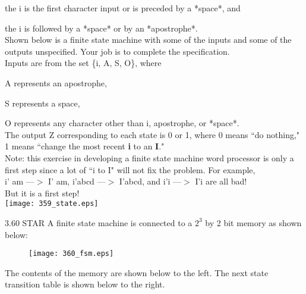 \documentclass{patt}
\begin{document}
\begin{exercises}
the i is the first character input or is preceded by a *space*, and

the i is followed by a *space* or by an *apostrophe*.
\\

\vspace{0.2in}
\noindent
Shown below is a finite state machine with some of the inputs and some of the
outputs unspecified.  Your job is to complete the specification.
\\
\vspace{0.2in}
\noindent
Inputs are from the set \{i, A, S, O\}, where 
\par A represents an apostrophe,
\par S represents a space,
\par O represents any character other than i, apostrophe, or *space*.
\\

\noindent
The output Z corresponding to each state is 0 or 1, where 
0 means ``do nothing,"
1 means ``change the most recent {\bf i} to an {\bf I}."
\\

\vspace{0.2in}
\noindent
Note: this exercise in developing a finite state machine word processor is
only a first step since a lot of ``i to I" will not fix the problem.  For example,
\\

i' am ---$>$ I' am, i'abcd ---$>$ I'abcd, and i'i ---$>$ I'i are all bad!
\\

\noindent
But it is a first step!
\\

\vspace{0.2in}
\texttt{[image: 359\_state.eps]}


\newpage

\item[3.60]STAR A finite state machine is connected to a $2^{3}$ by 2 bit memory as shown below:
\\

\begin{figure}[h]
\centering
\texttt{[image: 360\_fsm.eps]}
\end{figure}

\noindent
The contents of the memory are shown below to the left. The next state transition table is shown below to the right.


\end{exercises}
\end{document}
